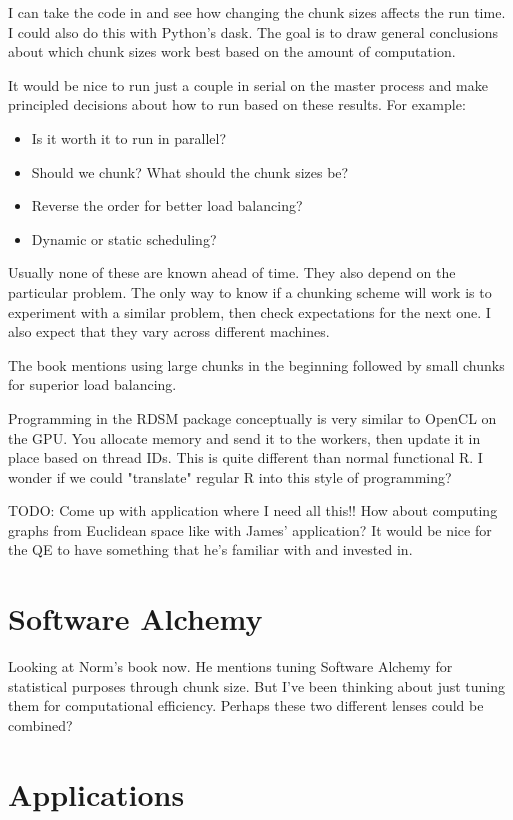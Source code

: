 \documentclass[12pt]{article}
\begin{document}
I can take the code in \cite{matloff2015parallel} and see how changing the
chunk sizes affects the run time. I could also do this with Python's dask.
The goal is to draw general conclusions about which chunk sizes work best
based on the amount of computation.

It would be nice to run just a couple in serial on the master process and
make principled decisions about how to run based on these results. For
example:
\begin{itemize}
    \item Is it worth it to run in parallel?
    \item Should we chunk? What should the chunk sizes be?
    \item Reverse the order for better load balancing?
    \item Dynamic or static scheduling?
\end{itemize}

Usually none of these are known ahead of time.  They also depend on the
particular problem.  The only way to know if a chunking scheme will work is
to experiment with a similar problem, then check expectations for the next
one. I also expect that they vary across different machines.

The book mentions using large chunks in the beginning followed by small
chunks for superior load balancing.

Programming in the RDSM package conceptually is very similar to OpenCL on
the GPU. You allocate memory and send it to the workers, then update it in
place based on thread IDs. This is quite different than normal functional
R. I wonder if we could "translate" regular R into this style of
programming?

TODO: Come up with application where I need all this!! How about computing
graphs from Euclidean space like with James' application? It would be nice
for the QE to have something that he's familiar with and invested in.

\section{Software Alchemy}

Looking at Norm's book now. He mentions tuning Software Alchemy for
statistical purposes through chunk size. But I've been thinking about just
tuning them for computational efficiency. Perhaps these two different
lenses could be combined?

\section{Applications}
\end{document}
